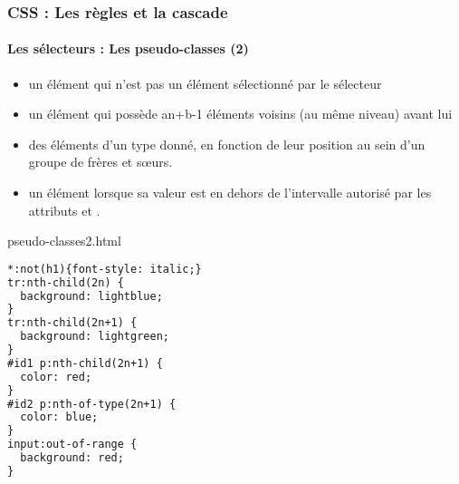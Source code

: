 \documentclass[xcolor=table]{beamer}
\begin{document}
\begin{frame}[fragile]
\frametitle{CSS : Les règles et la cascade}
\framesubtitle{Les sélecteurs : Les pseudo-classes (2)}

\begin{minipage}{0.60\textwidth} 
	\begin{itemize}
		\item {} un élément qui n'est pas un élément sélectionné par le sélecteur 
		\item {} un élément qui possède an+b-1 éléments voisins (au même niveau) avant lui 
		\item {} des éléments d'un type donné, en fonction de leur position au sein d'un groupe de frères et sœurs.
		\item {} un élément  lorsque sa valeur est en dehors de l'intervalle autorisé par les attributs  et .
	\end{itemize}
\end{minipage}
%
\begin{minipage}{0.38\textwidth}
\begin{block}{pseudo-classes2.html}
\scriptsize\bfseries\vspace{-6pt}
\begin{lstlisting}[language={html}]
*:not(h1){font-style: italic;}
tr:nth-child(2n) {
  background: lightblue;
}
tr:nth-child(2n+1) {
  background: lightgreen;
}
#id1 p:nth-child(2n+1) {
  color: red;
}
#id2 p:nth-of-type(2n+1) {
  color: blue;
}
input:out-of-range {
  background: red;
}
\end{lstlisting}\vspace{-6pt}
\end{block}
\end{minipage}
\end{frame}
\end{document}

